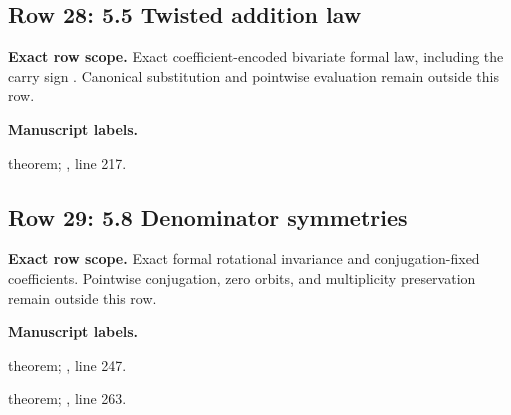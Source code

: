 \subsection{Row 28: 5.5 Twisted addition law}
\label{row:28}
\textbf{Exact row scope.} Exact coefficient-encoded bivariate formal law, including the carry sign . Canonical substitution and pointwise evaluation remain outside this row.\par\smallskip
\textbf{Manuscript labels.} \par\smallskip
{\small{}\par}
{\footnotesize\color{muted}theorem; , line 217.\par}\smallskip
{}
\subsection{Row 29: 5.8 Denominator symmetries}
\label{row:29}
\textbf{Exact row scope.} Exact formal rotational invariance and conjugation-fixed coefficients. Pointwise conjugation, zero orbits, and multiplicity preservation remain outside this row.\par\smallskip
\textbf{Manuscript labels.} \par\smallskip
{\small{}\par}
{\footnotesize\color{muted}theorem; , line 247.\par}\smallskip
{\small{}\par}
{\footnotesize\color{muted}theorem; , line 263.\par}\smallskip
{}
